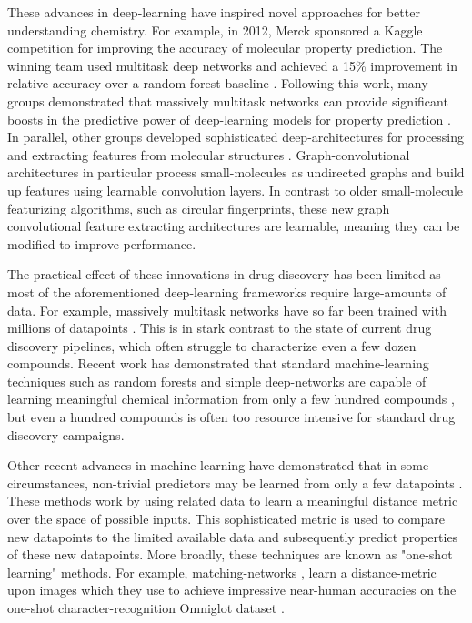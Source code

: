 \documentclass[journal=jacsat,manuscript=article]{achemso}
\begin{document}
These advances in deep-learning have inspired novel approaches for better understanding chemistry. For example, in 2012, Merck sponsored a Kaggle competition for improving the accuracy of molecular property prediction. The winning team used multitask deep networks and achieved a 15\% improvement in relative accuracy over a random forest baseline \cite{dahl2012deep}. Following this work, many groups demonstrated that massively multitask networks can provide significant boosts in the predictive power of deep-learning models for property prediction \cite{ramsundar2015massively, unterthiner2014deep}. In parallel, other groups developed sophisticated deep-architectures for processing and extracting features from molecular structures \cite{lusci2013deep}. Graph-convolutional architectures \cite{duvenaud2015convolutional, kearnes2016molecular} in particular process small-molecules as undirected graphs and build up features using learnable convolution layers. In contrast to older small-molecule featurizing algorithms, such as circular fingerprints\cite{rogers2010extended}, these new graph convolutional feature extracting architectures are learnable, meaning they can be modified to improve performance. 

The practical effect of these innovations in drug discovery has been limited as most of the aforementioned deep-learning frameworks require large-amounts of data. For example, massively multitask networks have so far been trained with millions of datapoints \cite{ramsundar2015massively}. This is in stark contrast to the state of current drug discovery pipelines, which often struggle to characterize even a few dozen compounds. Recent work has demonstrated that standard machine-learning techniques such as random forests and simple deep-networks are capable of learning meaningful chemical information from only a few hundred compounds \cite{subramanian2016computational}, but even a hundred compounds is often too resource intensive for standard drug discovery campaigns. 

Other recent advances in machine learning have demonstrated that in some circumstances, non-trivial predictors may be learned from only a few datapoints \cite{lake2015human, santoro2016one, vinyals2016matching}. These methods work by using related data to learn a meaningful distance metric over the space of possible inputs. This sophisticated metric is used to compare new datapoints to the limited available data and subsequently predict properties of these new datapoints. More broadly, these techniques are known as "one-shot learning" methods. For example, matching-networks \cite{vinyals2016matching}, learn a distance-metric upon images which they use to achieve impressive near-human accuracies on the one-shot character-recognition Omniglot dataset \cite{lake2015human}.
\end{document}

